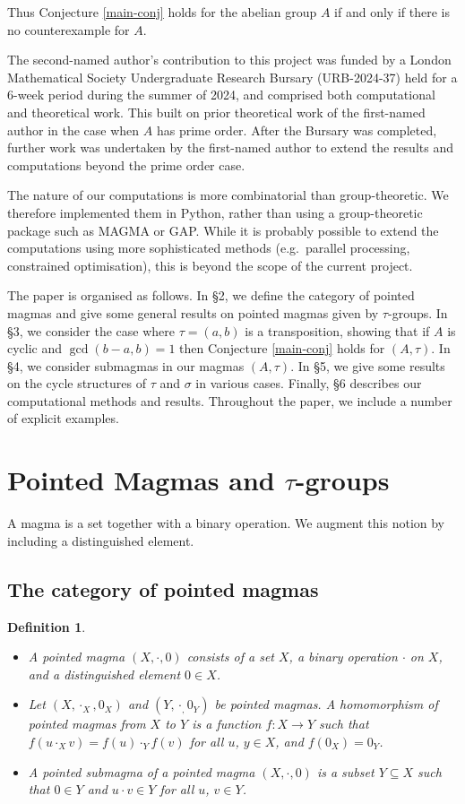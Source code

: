 \documentclass[letterpaper,12pt]{amsart}
\numberwithin{equation}{section}
\numberwithin{algorithm}{section}
\newtheorem{definition}[lemma]{Definition}
\theoremstyle{definition}
\begin{document}
Thus Conjecture \ref{main-conj} holds for the abelian group $A$ if and only if there is no counterexample for $A$.

The second-named author's contribution to this project was funded by a London Mathematical Society Undergraduate Research Bursary (URB-2024-37) held for a 6-week period during the summer of 2024, and comprised both computational and theoretical work. This built on prior theoretical work of the first-named author in the case when $A$ has prime order. After the Bursary was completed, further work was undertaken by the first-named author to extend the results and computations beyond the prime order case. 

The nature of our computations is more combinatorial than group-theoretic. We therefore implemented them in Python, rather than using a group-theoretic package such as MAGMA or GAP. While it is probably possible to extend the computations using more sophisticated methods (e.g.~parallel processing, constrained optimisation), this is beyond the scope of the current project.

The paper is organised as follows. In \S2, we define the category of pointed magmas and give some general results on pointed magmas given by $\tau$-groups. In \S3, we consider the case where $\tau=(a,b)$ is a transposition, showing that if $A$ is cyclic and $\gcd(b-a,b)=1$ then Conjecture \ref{main-conj} holds for $(A,\tau)$. In \S4, we consider submagmas in our magmas $(A, \tau)$. 
In \S5, we give some results on the cycle structures of $\tau$ and $\sigma$ in various cases. Finally, \S6 describes our computational methods and results. Throughout the paper, we include a number of explicit examples.

\section{Pointed Magmas and $\tau$-groups}
A magma is a set together with a binary operation. We augment this notion by
including a distinguished element.

\subsection{The category of pointed magmas}
\begin{definition} \label{mag-cat}
\begin{itemize}
\item[(i)] 
A {\em pointed magma} $(X, \cdot,0)$ consists of a set $X$, a binary operation
$\cdot$ on $X$, and a distinguished element $0 \in X$.
\item[(ii)] Let $(X, \cdot_X,0_X)$ and $(Y, \cdot_, 0_Y)$ be pointed magmas. A {\em homomorphism of pointed magmas} from $X$ to $Y$ is a function $f:X \to Y$ such that $f(u \cdot_X v) = f(u) \cdot_Y f(v)$ for all $u$, $y \in X$, and $f(0_X)=0_Y$.
\item[(iii)] A {\em pointed submagma} of a pointed magma $(X,\cdot,0)$ is a subset $Y \subseteq X$ such that $0 \in Y$ and $u \cdot v \in Y$ for all $u$, $v \in Y$. 
\end{itemize}
\end{definition}
	
\end{document}

